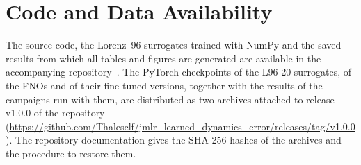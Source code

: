 












\section*{Code and Data Availability}
The source code, the Lorenz--96 surrogates trained with NumPy and the saved results from which all tables and figures are generated are available in the accompanying repository~\citep{fava2026code}. The PyTorch checkpoints of the L96-20 surrogates, of the FNOs and of their fine-tuned versions, together with the results of the campaigns run with them, are distributed as two archives attached to release v1.0.0 of the repository (\url{https://github.com/Thalesclf/jmlr_learned_dynamics_error/releases/tag/v1.0.0}). The repository documentation gives the SHA-256 hashes of the archives and the procedure to restore them.

\appendix






